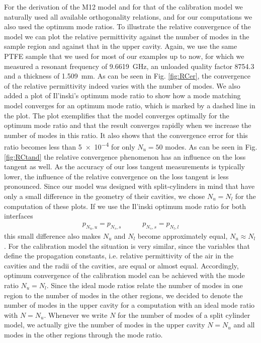 For the derivation of the M12 model and for that of the calibration model we naturally used all available orthogonality relations, and for our computations we also used the optimum mode ratios. To illustrate the relative convergence of the model we can plot the relative permittivity against the number of modes in the sample region and against that in the upper cavity. Again, we use the same PTFE sample that we used for most of our examples up to now, for which we measured a resonant frequency of \SI{9.6619}{\giga\hertz}, an unloaded quality factor \num{8754.3} and a thickness of \SI{1.509}{\milli\meter}. As can be seen in Fig. \ref{fig:RCer}, the convergence of the relative permittivity indeed varies with the number of modes. We also added a plot of Il'inski's optimum mode ratio to show how a mode matching model converges for an optimum mode ratio, which is marked by a dashed line in the plot. The plot exemplifies that the model converges optimally for the optimum mode ratio and that the result converges rapidly when we increase the number of modes in this ratio. It also shows that the convergence error for this ratio becomes less than \num{5e-4} for only $N_u=50$ modes. As can be seen in Fig. \ref{fig:RCtand} the relative convergence phenomenon has an influence on the loss tangent as well. As the accuracy of our loss tangent measurements is typically lower, the influence of the relative convergence on the loss tangent is less pronounced. Since our model was designed with split-cylinders in mind that have only a small difference in the geometry of their cavities, we chose $N_u=N_l$ for the computation of these plots. If we use the Il'inski optimum mode ratio for both interfaces
\begin{align}
p_{N_u,u}=p_{N_s,s} \quad\quad\quad p_{N_s,s}=p_{N_l,l}
\end{align} 
this small difference also makes $N_u$ and $N_l$ become approximately equal, $N_u\approx N_l$. For the calibration model the situation is very similar, since the variables that define the propagation constants, i.e. relative permittivity of the air in the cavities and the radii of the cavities, are equal or almost equal. Accordingly, optimum convergence of the calibration model can be achieved with the mode ratio $N_u=N_l$. Since the ideal mode ratios relate the number of modes in one region to the number of modes in the other regions, we decided to denote the number of modes in the upper cavity for a computation with an ideal mode ratio with $N=N_u$. Whenever we write $N$ for the number of modes of a split cylinder model, we actually give the number of modes in the upper cavity $N=N_u$ and all modes in the other regions through the mode ratio. 

